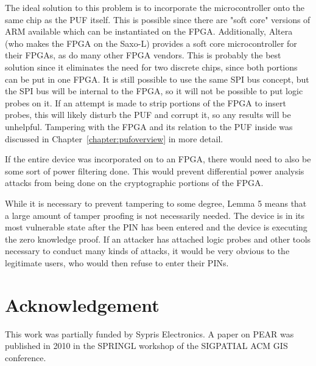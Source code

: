 The ideal solution to this problem is to incorporate the microcontroller onto the same chip as the PUF itself. This
is possible since there are "soft core" versions of ARM available which can be instantiated on the FPGA. Additionally,
Altera (who makes the FPGA on the Saxo-L) provides a soft core microcontroller for their FPGAs, as do many other
FPGA vendors. This is probably the best solution since it eliminates the need for two discrete chips, since both portions
can be put in one FPGA. It is still possible to use the same SPI bus concept, but the SPI bus will be internal to the
FPGA, so it will not be possible to put logic probes on it. If an attempt is made to strip portions of the FPGA to
insert probes, this will likely disturb the PUF and corrupt it, so any results will be unhelpful. Tampering with the FPGA
and its relation to the PUF inside was discussed in Chapter~\ref{chapter:pufoverview} in more detail.

If the entire device was incorporated on to an FPGA, there would need to also be some sort of power filtering done.
This would prevent differential power analysis attacks from being done on the cryptographic portions of the FPGA.

While it is necessary to prevent tampering to some degree, Lemma 5 means that a large amount of tamper proofing
is not necessarily needed. The device is in its most vulnerable state after the PIN has been entered and the device is
executing the zero knowledge proof. If an attacker has attached logic probes and other tools necessary to conduct
many kinds of attacks, it would be very obvious to the legitimate users, who would then refuse to enter their PINs.

\section{Acknowledgement}
This work was partially funded by Sypris Electronics. A paper on PEAR was published in 2010 in the SPRINGL workshop
of the SIGPATIAL ACM GIS conference.~\cite{PEAR}